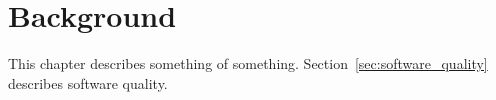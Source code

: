 
 \chapter{Background}
 
This chapter describes something of something. Section~\ref{sec:software_quality} describes software quality.

 
